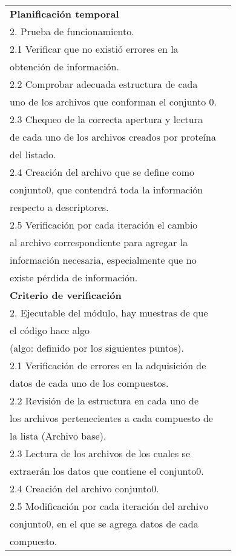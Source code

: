 \begin{longtable}{|l|l|}
\textbf{Planificación temporal}                                                        & \begin{tabular}[c]{@{}l@{}}1. Prueba de compilación.\\ 2. Prueba de funcionamiento.\\ 2.1 Verificar que no existió errores en la \\ obtención de información.\\ 2.2 Comprobar adecuada estructura de cada \\ uno de los archivos que conforman el conjunto 0.\\ 2.3 Chequeo de la correcta apertura  y lectura \\ de cada uno de los archivos creados por proteína \\ del listado.\\ 2.4 Creación del archivo que se define como \\ conjunto0, que contendrá toda la información \\ respecto a descriptores.\\ 2.5  Verificación por cada iteración el cambio \\ al archivo correspondiente para agregar la \\ información necesaria, especialmente que no \\ existe pérdida de información.\end{tabular}                                                                                                                                 \\ \hline
\textbf{Criterio de verificación}                                                      & \begin{tabular}[c]{@{}l@{}}1. Compilación del código.\\ 2. Ejecutable del módulo, hay muestras de que \\ el código hace algo\\ (algo: definido por los siguientes puntos).\\ 2.1 Verificación de errores en la adquisición de \\ datos de cada uno de  los compuestos.\\ 2.2 Revisión de la estructura en cada uno de \\ los archivos pertenecientes a cada compuesto de \\ la lista (Archivo base).\\ 2.3 Lectura de los archivos de los cuales se \\ extraerán los datos que contiene el conjunto0.\\ 2.4 Creación del archivo conjunto0.\\ 2.5 Modificación por cada iteración del archivo\\ conjunto0, en el que se agrega datos de cada \\ compuesto.\end{tabular}                                                                                                                                                                    \\ \hline

\end{longtable}
